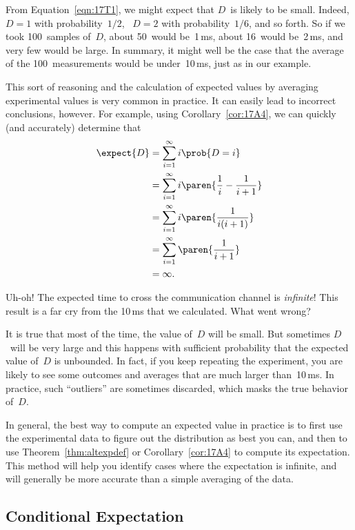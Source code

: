 From Equation~\ref{eqn:17T1}, we might expect that $D$~is likely to be
small.  Indeed, $D = 1$ with probability~$1/2$, \ $D = 2$ with
probability~$1/6$, and so forth.  So if we took 100~samples of~$D$,
about 50~would be~1\,ms, about 16~would be~2\,ms, and very few would
be large.  In summary, it might well be the case that the average of
the 100~measurements would be under~10\,ms, just as in our example.

This sort of reasoning and the calculation of expected values by
averaging experimental values is very common in practice.  It can
easily lead to incorrect conclusions, however.  For example, using
Corollary~\ref{cor:17A4}, we can quickly (and accurately) determine
that
\begin{align*}
\expect{D}
    &= \sum_{i = 1}^\infty i \prob{D = i} \\
    &= \sum_{i = 1}^\infty i \paren{\frac{1}{i} - \frac{1}{i + 1}} \\
    &= \sum_{i = 1}^\infty i \paren{\frac{1}{i (i + 1)}} \\
    &= \sum_{i = 1}^\infty \paren{\frac{1}{i + 1}} \\
    &= \infty.
\end{align*}

Uh-oh! The expected time to cross the communication channel is
\emph{infinite}!  This result is a far cry from the 10\,ms that we
calculated.  What went wrong?

It is true that most of the time, the value of~$D$ will be small.  But
sometimes $D$~will be very large and this happens with sufficient
probability that the expected value of~$D$ is unbounded.  In fact, if
you keep repeating the experiment, you are likely to see some outcomes
and averages that are much larger than~10\,ms.  In practice, such
``outliers'' are sometimes discarded, which masks the true behavior
of~$D$.

In general, the best way to compute an expected value in practice is
to first use the experimental data to figure out the distribution as
best you can, and then to use Theorem~\ref{thm:altexpdef} or
Corollary~\ref{cor:17A4} to compute its expectation.  This method will
help you identify cases where the expectation is infinite, and will
generally be more accurate than a simple averaging of the data.

\subsection{Conditional Expectation}


